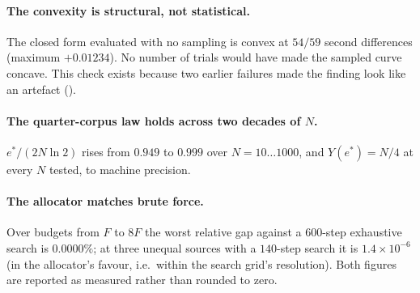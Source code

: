 \documentclass[11pt,twocolumn,a4paper]{article}
\theoremstyle{thmstyle}
\theoremstyle{definition}
\theoremstyle{remark}
\newcommand{\estar}{e^{*}}
\newcommand{\yield}{Y}
\begin{document}
\paragraph{The convexity is structural, not statistical.} The closed form
evaluated with no sampling is convex at $54/59$ second differences
(maximum $+0.01234$). No number of trials would have made the sampled
curve concave. This check exists because two earlier failures made the
finding look like an artefact ().

\paragraph{The quarter-corpus law holds across two decades of $N$.}
$\estar/(2N\ln2)$ rises from $0.949$ to $0.999$ over $N=10\ldots1000$,
and $\yield(\estar)=N/4$ at every $N$ tested, to machine precision.

\paragraph{The allocator matches brute force.} Over budgets from $F$ to
$8F$ the worst relative gap against a $600$-step exhaustive search is
$0.0000\%$; at three unequal sources with a $140$-step search it is
$1.4\times10^{-6}$ (in the allocator's favour, i.e.\ within the search
grid's resolution). Both figures are reported as measured rather than
rounded to zero.
\end{document}
